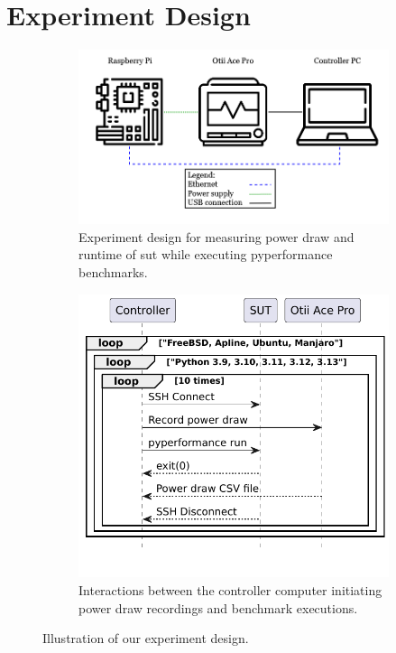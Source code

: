 \section{Experiment Design}\label{sec:experimentdesign}

\begin{figure}[t]
\begin{subfigure}[t]{0.58\textwidth}
    \centering
    \includegraphics[width=\textwidth]{images/experiment.png}
    \caption{Experiment design for measuring power draw and runtime of \gls{sut} while executing \gls{pyperformance} benchmarks.}
    \label{fig:design}
\end{subfigure}
\hspace{\fill}
\begin{subfigure}[t]{0.4\textwidth}
    \centering
    \includegraphics[width=\textwidth]{images/scenario.pdf}
    \caption{Interactions between the controller computer initiating power draw recordings and benchmark executions.}
    \label{fig:sequence}
\end{subfigure}
\caption{Illustration of our experiment design.}\label{fig:exp_scen}
\end{figure}





